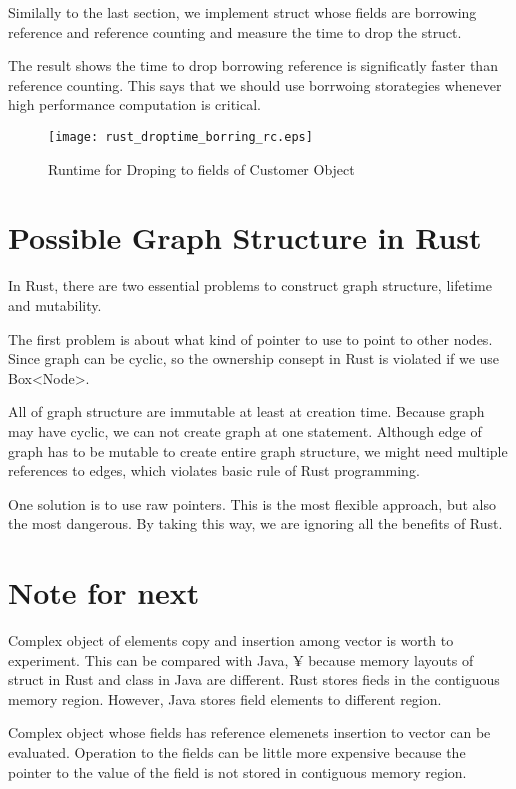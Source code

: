 Similally to the last section, we implement struct whose fields are borrowing reference and reference counting and measure the time to drop the struct. 

The result shows the time to drop borrowing reference is significatly faster than reference counting. This says that we should use borrwoing storategies whenever high performance computation is critical.


\begin{figure}[htb]
    \texttt{[image: rust\_droptime\_borring\_rc.eps]}
    \caption{Runtime for Droping to fields of Customer Object}
    \label{fig:Sampling}
\end{figure}

\section{Possible Graph Structure in Rust}
\label{sec:history}
In Rust, there are two essential problems to construct graph structure, lifetime and mutability. 

The first problem is about what kind of pointer to use to point to other nodes. 
Since graph can be cyclic, so the ownership consept in Rust is violated if we use Box<Node>.

All of graph structure are immutable at least at creation time. Because graph may have cyclic, 
we can not create graph at one statement. Although edge of graph has to be mutable to create entire graph structure, 
we might need multiple references to edges, which violates basic rule of Rust programming.

One solution is to use raw pointers. This is the most flexible approach, but also the most dangerous. 
By taking this way, we are ignoring all the benefits of Rust.


\section{Note for next}
\label{sec:history}
Complex object of elements copy and insertion among vector is worth to experiment. This can be compared with Java, ¥
because memory layouts of struct in Rust and class in Java are different. Rust stores fieds in the contiguous memory region. 
However, Java stores field elements to different region.

Complex object whose fields has reference elemenets insertion to vector can be evaluated. Operation to the fields can be little 
more expensive because the pointer to the value of the field is not stored in contiguous memory region.

